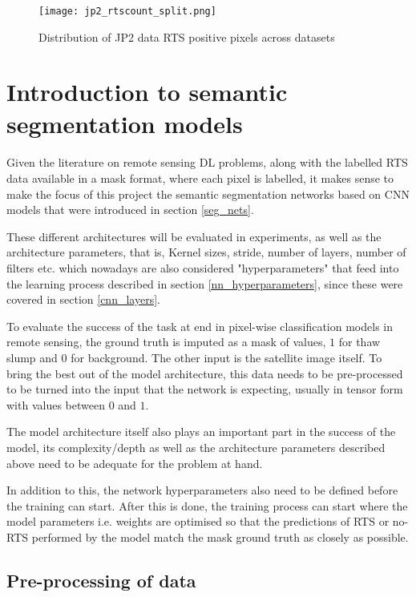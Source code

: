     \begin{figure}[hbt!]
        \centering
        \texttt{[image: jp2\_rtscount\_split.png]}
        \caption{Distribution of \gls{JP2} data \gls{RTS} positive pixels across datasets}
        \label{jp2_rts_pixel_dist}
    \end{figure}
\section{Introduction to semantic segmentation models}
\paragraph{}
Given the literature on remote sensing \gls{DL} problems, along with the labelled \gls{RTS} data available in a mask format, where each pixel is labelled, it makes sense to make the focus of this project the semantic segmentation networks based on CNN models that were introduced in section \ref{seg_nets}.

These different architectures will be evaluated in experiments, as well as the architecture parameters, that is, Kernel sizes, stride, number of layers, number of filters etc. which nowadays are also considered "hyperparameters" that feed into the learning process described in section \ref{nn_hyperparameters}, since these were covered in section \ref{cnn_layers}.

To evaluate the success of the task at end in pixel-wise classification models in remote sensing, the ground truth is imputed as a mask of values, $1$ for thaw slump and $0$ for background. The other input is the satellite image itself. To bring the best out of the model architecture, this data needs to be pre-processed to be turned into the input that the network is expecting, usually in tensor form with values between $0$ and $1$.

The model architecture itself also plays an important part in the success of the model, its complexity/depth as well as the architecture parameters described above need to be adequate for the problem at hand.

In addition to this, the network hyperparameters also need to be defined before the training can start. After this is done, the training process can start where the model parameters i.e. weights are optimised so that the predictions of \gls{RTS} or no-\gls{RTS} performed by the model match the mask ground truth as closely as possible.

\subsection{Pre-processing of data} \label{data_preproc}
